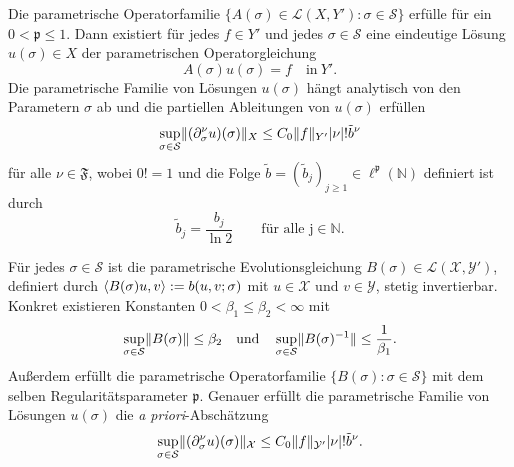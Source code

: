 \begin{Satz}
    \label{thm:kunoth:theorem4}
    Die parametrische Operatorfamilie $\{ A(\sigma) \in \mathcal L(X, Y') : \sigma \in \mathcal S \}$ erfülle  für ein $0 < \mathfrak p \leq 1$.
    Dann existiert für jedes $f \in Y'$ und jedes $\sigma \in \mathcal S$ eine eindeutige Lösung $u(\sigma) \in X$ der parametrischen Operatorgleichung
    \begin{equation}
        A(\sigma) u(\sigma) = f \quad \text{in}~Y'.
    \end{equation}
    Die parametrische Familie von Lösungen $u(\sigma)$ hängt analytisch von den Parametern $\sigma$ ab und die partiellen Ableitungen von $u(\sigma)$ erfüllen
    \begin{equation}
        \sup_{\sigma \in \mathcal S} \lVert(\partial^{\nu}_{\sigma} u)(\sigma)\rVert_{X} \leq C_{0} \lVert f\rVert_{Y'} \lvert\nu\rvert! \tilde{b}^{\nu}
    \end{equation}
    für alle $\nu \in \mathfrak F$, wobei $0! = 1$ und die Folge $\tilde{b} = (\tilde{b}_{j})_{j \geq 1} \in \ell^{\mathfrak p}(\mathbb{N})$ definiert ist durch
    \begin{equation}
        \tilde{b}_{j} = \frac{b_{j}}{\ln 2} \qquad \text{für alle j} \in \mathbb{N}.
    \end{equation}
\end{Satz}

\begin{Satz}
    \label{thm:kunoth:theorem21}
    Für jedes $\sigma \in \mathcal S$ ist die parametrische Evolutionsgleichung $B(\sigma) \in \mathcal L(\mathcal X, \mathcal Y')$, definiert durch $\left\langle B(\sigma) u,v\right\rangle := b(u, v; \sigma)$ mit $u \in \mathcal X$ und $v \in \mathcal Y$, stetig invertierbar.
    Konkret existieren Konstanten $0 < \beta_{1} \leq \beta_{2} < \infty$ mit
    \begin{equation}
        \sup_{\sigma \in \mathcal S} \lVert B(\sigma)\rVert \leq \beta_{2} \quad \text{und} \quad  \sup_{\sigma \in \mathcal S} \lVert B(\sigma)^{-1}\rVert \leq \frac{1}{\beta_{1}}.
    \end{equation}
    Außerdem erfüllt die parametrische Operatorfamilie $\{ B(\sigma) : \sigma \in \mathcal S \}$  mit dem selben Regularitätsparameter $\mathfrak p$.
    Genauer erfüllt die parametrische Familie von Lösungen $u(\sigma)$ die \emph{a priori}-Abschätzung
    \begin{equation}
        \sup_{\sigma \in \mathcal S} \lVert(\partial^{\nu}_{\sigma} u)(\sigma)\rVert_{\mathcal X} \leq C_{0} \lVert f\rVert_{\mathcal Y'} \lvert\nu\rvert! \tilde{b}^{\nu}.
    \end{equation}
\end{Satz}


